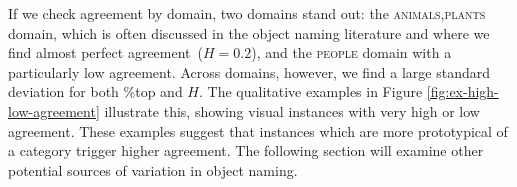 If we check agreement by domain, two domains stand out: the \textsc{animals,plants} domain, which is often discussed in the object naming literature and where we find almost perfect agreement\ (\mbox{$H=0.2$}), and the \textsc{people} domain with a particularly low agreement.
Across domains, however, we find a large standard deviation for both \%top and $H$.
The qualitative examples in Figure \ref{fig:ex-high-low-agreement} %
illustrate this, showing visual instances with very high or low agreement. 
These examples suggest that instances which are more prototypical of a category trigger higher agreement.
The following section will examine other potential sources of variation in object naming.


